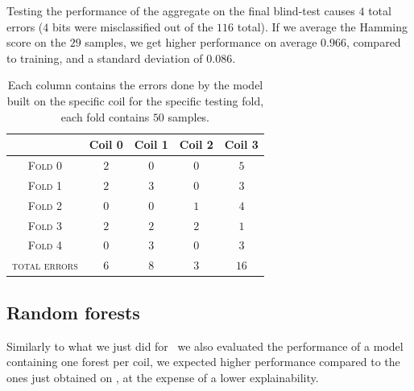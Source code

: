 Testing the performance of the aggregate on the final blind-test causes $4$ total errors ($4$ bits
were misclassified out of the $116$ total). If we average the Hamming score on the $29$ samples, we get higher
performance on average $0.966$, compared to training, and a standard deviation of $0.086$.
\begin{table}[!ht]
	\caption{Each column contains the errors done by the model built on the specific coil for
	the specific testing fold, each fold contains $50$ samples.}\label{tbl:dt-errors}

	\bigskip
	\setlength{\tabcolsep}{6pt}
	\centering
	\begin{tabular}{ccccc}
		\toprule
		\textbf{}                     & \textbf{Coil 0}    & \textbf{Coil 1} & \textbf{Coil 2} & \textbf{Coil 3}
		\\
		\midrule
		\textsc{Fold 0}         & $2$           & $0$           & $0$            & $5$            \\
		\textsc{Fold 1}         & $2$		& $3$		& $0$            & $3$		  \\
		\textsc{Fold 2}		& $0$           & $0$		& $1$            & $4$            \\
		\textsc{Fold 3}         & $2$           & $2$ 		& $2$            & $1$            \\
		\textsc{Fold 4}         & $0$		& $3$           & $0$            & $3$            \\
		\midrule
		\textsc{total errors}	& $6$		& $8$		& $3$		& $16$
		\\
		\bottomrule
	\end{tabular}
\end{table}

\subsection{Random forests}
Similarly to what we just did for \dts\ we also evaluated the performance of a model containing one forest per coil, we expected higher performance compared to the ones just obtained on \dts, at the expense of a lower explainability.

